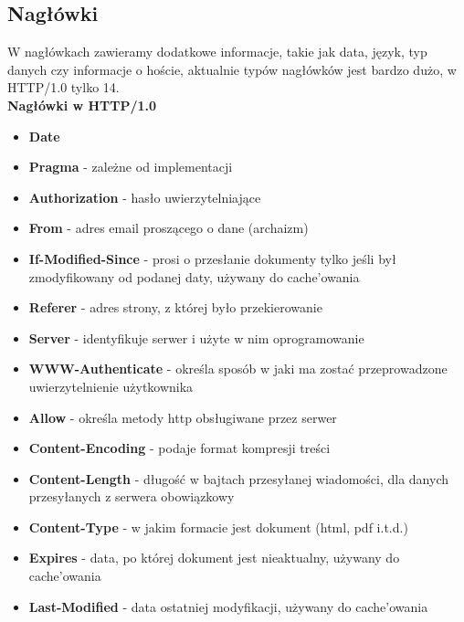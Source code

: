 \documentclass[]{article}
\begin{document}
\subsection{Nagłówki}
W nagłówkach zawieramy dodatkowe informacje, takie jak data, język, typ danych czy informacje o hoście, aktualnie typów nagłówków jest bardzo dużo, w HTTP/1.0 tylko 14.\\
\textbf{Nagłówki w HTTP/1.0}
\begin{multicols}{2}
\begin{itemize}
    \item \textbf{Date}
    \item \textbf{Pragma} - zależne od implementacji
    \item \textbf{Authorization} - hasło uwierzytelniające
    \item \textbf{From} - adres email proszącego o dane (archaizm)
    \item \textbf{If-Modified-Since} - prosi o przesłanie dokumenty tylko jeśli był zmodyfikowany od podanej daty, używany do cache'owania
    \item \textbf{Referer} - adres strony, z której było przekierowanie
    \item \textbf{Server} - identyfikuje serwer i użyte w nim oprogramowanie
    \item \textbf{WWW-Authenticate} - określa sposób w jaki ma zostać przeprowadzone uwierzytelnienie użytkownika
    \item \textbf{Allow} - określa metody http obsługiwane przez serwer
    \item \textbf{Content-Encoding} - podaje format kompresji treści
    \item \textbf{Content-Length} - długość w bajtach przesyłanej wiadomości, dla danych przesyłanych z serwera obowiązkowy
    \item \textbf{Content-Type} - w jakim formacie jest dokument (html, pdf i.t.d.)
    \item \textbf{Expires} - data, po której dokument jest nieaktualny, używany do cache'owania
    \item \textbf{Last-Modified} - data ostatniej modyfikacji, używany do cache'owania
\end{itemize}
\end{multicols}
\end{document}
